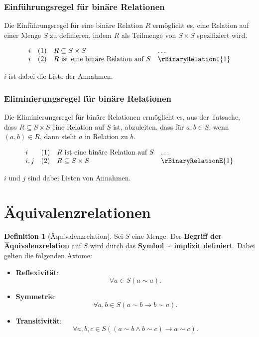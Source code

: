 \documentclass{book}
\theoremstyle{plain}
\theoremstyle{remark}
\theoremstyle{definition}
\newtheorem{definition}{Definition}[section]
\begin{document}
\subsubsection*{Einführungsregel für binäre Relationen}
\label{rule:rBinaryRelationI}
Die Einführungsregel für eine binäre Relation \(R\) ermöglicht es, eine Relation auf einer Menge \(S\) zu definieren, indem \(R\) als Teilmenge von \(S \times S\) spezifiziert wird.

\[
\begin{array}{llll}
    i       & (1) & R \subseteq S \times S & \dots \\
    i       & (2) & R \text{ ist eine binäre Relation auf } S & \rBinaryRelationI{1}
\end{array}
\]

\(i\) ist dabei die Liste der Annahmen.

\subsubsection*{Eliminierungsregel für binäre Relationen}
\label{rule:rBinaryRelationE}
Die Eliminierungsregel für binäre Relationen ermöglicht es, aus der Tatsache, dass \(R \subseteq S \times S\) eine Relation auf \(S\) ist, abzuleiten, dass für \(a, b \in S\), wenn \((a,b) \in R\), dann steht \(a\) in Relation zu \(b\).

\[
\begin{array}{llll}
    i       & (1) & R \text{ ist eine binäre Relation auf } S & \dots \\
    i,j     & (2) & R \subseteq S \times S & \rBinaryRelationE{1}
\end{array}
\]

\(i\) und \(j\) sind dabei Listen von Annahmen.



\section{Äquivalenzrelationen}

\begin{definition}[Äquivalenzrelation]
    Sei \(S\) eine Menge. Der \textbf{Begriff der Äquivalenzrelation} auf \(S\) wird durch das \textbf{Symbol} \(\sim\) \textbf{implizit definiert}. Dabei gelten die folgenden Axiome:
    
    \begin{itemize}
        \item \textbf{Reflexivität}:
        \[
        \forall a \in S (a \sim a).
        \]
        
        \item \textbf{Symmetrie}: 
        \[
        \forall a, b \in S (a \sim b \rightarrow b \sim a).
        \]
        
        \item \textbf{Transitivität}: 
        \[
        \forall a, b, c \in S ((a \sim b \land b \sim c) \rightarrow a \sim c).
        \]
    \end{itemize}
\end{definition}
\end{document}
